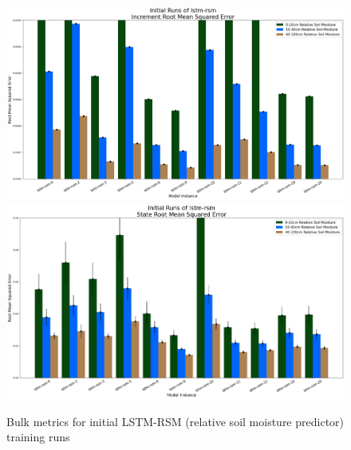 \begin{figure}[hp!]
    \includegraphics[width=.48\linewidth,draft=false]{figures/efficiency_initial-best/eval_test_efficiency_initial-lstm-rsm_mse_res.png}
    \includegraphics[width=.48\linewidth,draft=false]{figures/efficiency_initial-best/eval_test_efficiency_initial-lstm-rsm_mse_state.png}

    \caption{Bulk metrics for initial LSTM-RSM (relative soil moisture predictor) training runs}
    \label{model-init-lstm-rsm}
\end{figure}

